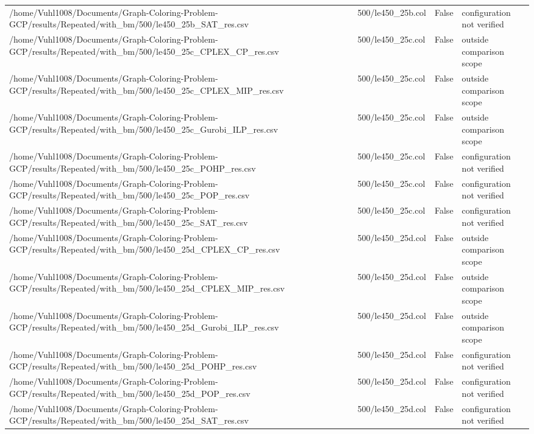 \begin{table}[htbp]
\begin{tabular}{llll}
/home/Vuhl1008/Documents/Graph-Coloring-Problem-GCP/results/Repeated/with\_bm/500/le450\_25b\_SAT\_res.csv & 500/le450\_25b.col & False & configuration not verified \\
/home/Vuhl1008/Documents/Graph-Coloring-Problem-GCP/results/Repeated/with\_bm/500/le450\_25c\_CPLEX\_CP\_res.csv & 500/le450\_25c.col & False & outside comparison scope \\
/home/Vuhl1008/Documents/Graph-Coloring-Problem-GCP/results/Repeated/with\_bm/500/le450\_25c\_CPLEX\_MIP\_res.csv & 500/le450\_25c.col & False & outside comparison scope \\
/home/Vuhl1008/Documents/Graph-Coloring-Problem-GCP/results/Repeated/with\_bm/500/le450\_25c\_Gurobi\_ILP\_res.csv & 500/le450\_25c.col & False & outside comparison scope \\
/home/Vuhl1008/Documents/Graph-Coloring-Problem-GCP/results/Repeated/with\_bm/500/le450\_25c\_POHP\_res.csv & 500/le450\_25c.col & False & configuration not verified \\
/home/Vuhl1008/Documents/Graph-Coloring-Problem-GCP/results/Repeated/with\_bm/500/le450\_25c\_POP\_res.csv & 500/le450\_25c.col & False & configuration not verified \\
/home/Vuhl1008/Documents/Graph-Coloring-Problem-GCP/results/Repeated/with\_bm/500/le450\_25c\_SAT\_res.csv & 500/le450\_25c.col & False & configuration not verified \\
/home/Vuhl1008/Documents/Graph-Coloring-Problem-GCP/results/Repeated/with\_bm/500/le450\_25d\_CPLEX\_CP\_res.csv & 500/le450\_25d.col & False & outside comparison scope \\
/home/Vuhl1008/Documents/Graph-Coloring-Problem-GCP/results/Repeated/with\_bm/500/le450\_25d\_CPLEX\_MIP\_res.csv & 500/le450\_25d.col & False & outside comparison scope \\
/home/Vuhl1008/Documents/Graph-Coloring-Problem-GCP/results/Repeated/with\_bm/500/le450\_25d\_Gurobi\_ILP\_res.csv & 500/le450\_25d.col & False & outside comparison scope \\
/home/Vuhl1008/Documents/Graph-Coloring-Problem-GCP/results/Repeated/with\_bm/500/le450\_25d\_POHP\_res.csv & 500/le450\_25d.col & False & configuration not verified \\
/home/Vuhl1008/Documents/Graph-Coloring-Problem-GCP/results/Repeated/with\_bm/500/le450\_25d\_POP\_res.csv & 500/le450\_25d.col & False & configuration not verified \\
/home/Vuhl1008/Documents/Graph-Coloring-Problem-GCP/results/Repeated/with\_bm/500/le450\_25d\_SAT\_res.csv & 500/le450\_25d.col & False & configuration not verified \\

\end{tabular}
\end{table}
